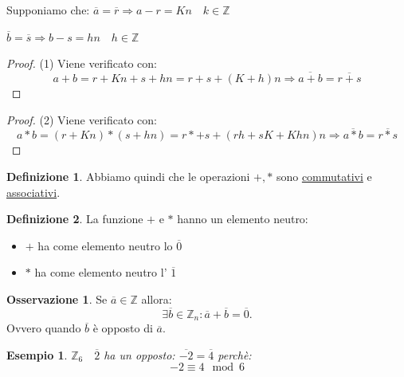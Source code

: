 \documentclass{article}
\newtheorem{exmp}{Esempio}[section]
\theoremstyle{definition}
\newtheorem{definition}{Definizione}[section]
\newtheorem{oss}{Osservazione}[section]
\begin{document}
Supponiamo che:
$\overline{a} = \overline{r} \Rightarrow a - r = Kn \quad k \in \mathbb{Z}$ \par 
$\overline{b} = \overline{s} \Rightarrow b - s = hn \quad h \in \mathbb{Z}$ \par 

\begin{proof}
        (1) Viene verificato con:
       \begin{equation*}
               a + b = r + Kn + s + hn = r+s + (K+h)n \Rightarrow \overline{a+b} = \overline{r + s}
       \end{equation*}
\end{proof}

\begin{proof}
       (2) Viene verificato con:
       \begin{equation*}
               a * b = (r + Kn) * (s + hn) = r*+s + (rh +sK + Khn)n \Rightarrow \overline{a*b} = \overline{r * s}
       \end{equation*}
\end{proof}


\begin{definition}
        Abbiamo quindi che le operazioni $+ , *$ sono \underline{commutativi} e \underline{associativi}. 
\end{definition}


\begin{definition}
        La funzione $+$ e $ * $ hanno un elemento neutro:
        \begin{itemize}
                \item $+$ ha come elemento neutro lo $\overline{0}$ 
                \item $*$ ha come elemento neutro l' $\overline{1}$ 
        \end{itemize}
\end{definition}

\begin{oss}
        Se $\overline{a} \in \mathbb{Z}$ allora:
        \begin{equation*}
                \exists \overline{b} \in \mathbb{Z}_n : \overline{a} + \overline{b} = \overline{0}.
        \end{equation*}
        Ovvero quando $ \overline{b}$ è opposto di $\overline{a}$.
\end{oss}

\begin{exmp}
        $ \mathbb{Z}_6 \quad \overline{2}$ ha un opposto: $\overline{-2} = \overline{4}$ perchè:
        \begin{equation*}
                -2 \equiv 4 \mod 6
        \end{equation*}
\end{exmp}
\end{document}
